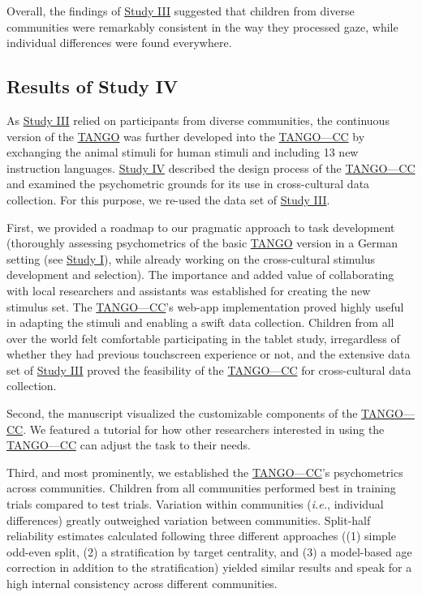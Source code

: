 \documentclass[
]{scrbook}
\begin{document}
Overall, the findings of \hyperref[studyIII]{Study III} suggested that children from diverse communities were remarkably consistent in the way they processed gaze, while individual differences were found everywhere.

\subsection{Results of Study IV}\label{resultsIV}

As \hyperref[studyIII]{Study III} relied on participants from diverse communities, the continuous version of the \hyperref[acronyms_TANGO]{TANGO} was further developed into the \hyperref[acronyms_TANGOux2014CC]{TANGO---CC} by exchanging the animal stimuli for human stimuli and including 13 new instruction languages. \hyperref[studyIV]{Study IV} described the design process of the \hyperref[acronyms_TANGOux2014CC]{TANGO---CC} and examined the psychometric grounds for its use in cross-cultural data collection. For this purpose, we re-used the data set of \hyperref[studyIII]{Study III}.

First, we provided a roadmap to our pragmatic approach to task development (thoroughly assessing psychometrics of the basic \hyperref[acronyms_TANGO]{TANGO} version in a German setting (see \hyperref[studyI]{Study I}), while already working on the cross-cultural stimulus development and selection). The importance and added value of collaborating with local researchers and assistants was established for creating the new stimulus set. The \hyperref[acronyms_TANGOux2014CC]{TANGO---CC}'s web-app implementation proved highly useful in adapting the stimuli and enabling a swift data collection. Children from all over the world felt comfortable participating in the tablet study, irregardless of whether they had previous touchscreen experience or not, and the extensive data set of \hyperref[studyIII]{Study III} proved the feasibility of the \hyperref[acronyms_TANGOux2014CC]{TANGO---CC} for cross-cultural data collection.

Second, the manuscript visualized the customizable components of the \hyperref[acronyms_TANGOux2014CC]{TANGO---CC}. We featured a tutorial for how other researchers interested in using the \hyperref[acronyms_TANGOux2014CC]{TANGO---CC} can adjust the task to their needs.

Third, and most prominently, we established the \hyperref[acronyms_TANGOux2014CC]{TANGO---CC}'s psychometrics across communities. Children from all communities performed best in training trials compared to test trials. Variation within communities (\emph{i.e.}, individual differences) greatly outweighed variation between communities. Split-half reliability estimates calculated following three different approaches ((1) simple odd-even split, (2) a stratification by target centrality, and (3) a model-based age correction in addition to the stratification) yielded similar results and speak for a high internal consistency across different communities.
\end{document}
